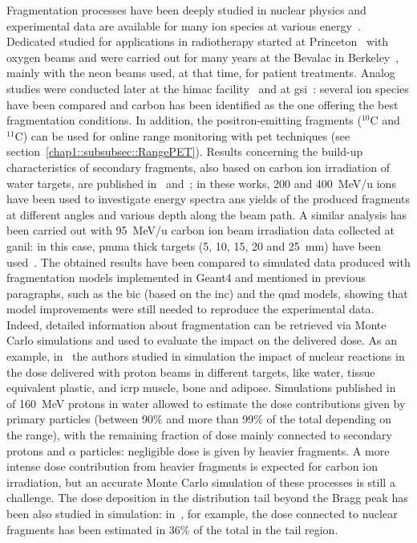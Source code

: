 Fragmentation processes have been deeply studied in nuclear physics and experimental data are available for many ion species at various energy~\parencite{Friedlander1982}. Dedicated studied for applications in radiotherapy started at Princeton~\parencite{MacCabee1974} with oxygen beams and were carried out for many years at the Bevalac in Berkeley~\parencite{Schimmerling1983, Schimmerling1989, Llacer1984, Llacer1990}, mainly with the neon beams used, at that time, for patient treatments. Analog studies were conducted later at the \gls{himac} facility~\parencite{Matsufuji2003, Matsufuji2005} and at \gls{gsi}~\parencite{Schall1996, Golovkov1997}: several ion species have been compared and carbon has been identified as the one offering the best fragmentation conditions. In addition, the positron-emitting fragments ($^10$C and $^11$C) can be used for online range monitoring with \gls{pet} techniques (see section~\ref{chap1::subsubsec::RangePET}). Results concerning the build-up characteristics of secondary fragments, also based on carbon ion irradiation of water targets, are published in~\cite{Haettner2006} and~\cite{Haettner2013}; in these works, 200 and 400~MeV/u ions have been used to investigate energy spectra ans yields of the produced fragments at different angles and various depth along the beam path. A similar analysis has been carried out with 95~MeV/u carbon ion beam irradiation data collected at \gls{ganil}: in this case, \gls{pmma} thick targets (5, 10, 15, 20 and 25~mm) have been used~\parencite{Braunn2010, Braunn2011}. The obtained results have been compared to simulated data produced with fragmentation models implemented in Geant4 and mentioned in previous paragraphs, such as the \gls{bic} (based on the \gls{inc}) and the \gls{qmd} models, showing that model improvements were still needed to reproduce the experimental data.
Indeed, detailed information about fragmentation can be retrieved via Monte Carlo simulations and used to evaluate the impact on the delivered dose. As an example, in~\cite{Wroe2005} the authors studied in simulation the impact of nuclear reactions in the dose delivered with proton beams in different targets, like water, tissue equivalent plastic, and \gls{icrp} muscle, bone and adipose. Simulations published in~\parencite{Grassberger2011} of 160~MeV protons in water allowed to estimate the dose contributions given by primary particles (between 90\% and more than 99\% of the total depending on the range), with the remaining fraction of dose mainly connected to secondary protons and $\alpha$ particles: negligible dose is given by heavier fragments. A more intense dose contribution from heavier fragments is expected for carbon ion irradiation, but an accurate Monte Carlo simulation of these processes is still a challenge. The dose deposition in the distribution tail beyond the Bragg peak has been also studied in simulation: in~\cite{Francis2014}, for example, the dose connected to nuclear fragments has been estimated in 36\% of the total in the tail region. 

